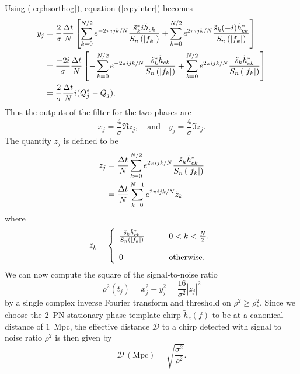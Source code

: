Using (\ref{eq:hsorthog}), equation (\ref{eq:yinter}) becomes
\begin{equation}
\begin{split}
y_j &= 
\frac{2}{\sigma}\frac{\Delta t}{N}
\left[
  \sum_{k=0}^{N/2} e^{-2\pi ijk/N} 
  \frac{\tilde{s}_k^\ast i\tilde{h}_{ck}}{S_n\left(\left|f_{k}\right|\right)}
  +
  \sum_{k=0}^{N/2} e^{2\pi ijk/N} 
  \frac{\tilde{s}_k (-i)\tilde{h}_{ck}^\ast}{S_n\left(\left|f_{k}\right|\right)}
\right] \\
& = 
\frac{-2i}{\sigma}\frac{\Delta t}{N}
\left[
  - \sum_{k=0}^{N/2} e^{-2\pi ijk/N} 
  \frac{\tilde{s}_k^\ast \tilde{h}_{ck}}{S_n\left(\left|f_{k}\right|\right)}
  +
  \sum_{k=0}^{N/2} e^{2\pi ijk/N} 
  \frac{\tilde{s}_k \tilde{h}_{ck}^\ast}{S_n\left(\left|f_{k}\right|\right)}
\right] \\
& = 
\frac{2}{\sigma}\frac{\Delta t}{N}i(Q_j^\ast - Q_j).
\end{split}
\end{equation}
Thus the outputs of the filter for the two phases are
\begin{equation}
x_j = \frac{4}{\sigma} \Re z_j,
\quad\mathrm{and}\quad
y_j = \frac{4}{\sigma} \Im z_j.
\end{equation}
The quantity $z_j$ is defined to be
\begin{equation}
\begin{split}
\label{eq:zdef}
z_j &= \frac{\Delta t}{N}\sum_{k=0}^{N/2} e^{2\pi ijk/N} 
\frac{\tilde{s}_k \tilde{h}_{ck}^\ast}{S_n\left(\left|f_{k}\right|\right)}  \\
&= \frac{\Delta t}{N}\sum_{k=0}^{N-1} e^{2\pi ijk/N} \tilde{z}_k
\end{split}
\end{equation}
where
\begin{equation}
\label{eq:ztildedef}
\tilde{z}_k = \left\{
\begin{array}{ll}
\frac{\tilde{s}_k \tilde{h}_{ck}^\ast}{S_n\left(\left|f_{k}\right|\right)} 
  \quad\quad & 0 < k < \frac{N}{2},\\
\\
0 & \mathrm{otherwise}.
\end{array}
\right.
\end{equation}
We can now compute the square of the signal-to-noise ratio
\begin{equation}
\rho^2(t_j) = x_j^2 + y_j^2 = \frac{16}{\sigma^2}|z_j|^2
\end{equation}
by a single complex inverse Fourier transform and threshold on 
$\rho^2 \ge \rho^2_\ast$.  Since we choose the 2~PN stationary phase template
chirp $\tilde{h}_c(f)$ to be at a canonical distance of $1$~Mpc, the effective
distance $\mathcal{D}$ to a chirp detected with signal to noise ratio $\rho^2$
is then given by
\begin{equation}
\mathcal{D}\,(\mathrm{Mpc})= \sqrt{\frac{\sigma^2}{\rho^2}}.
\end{equation}

